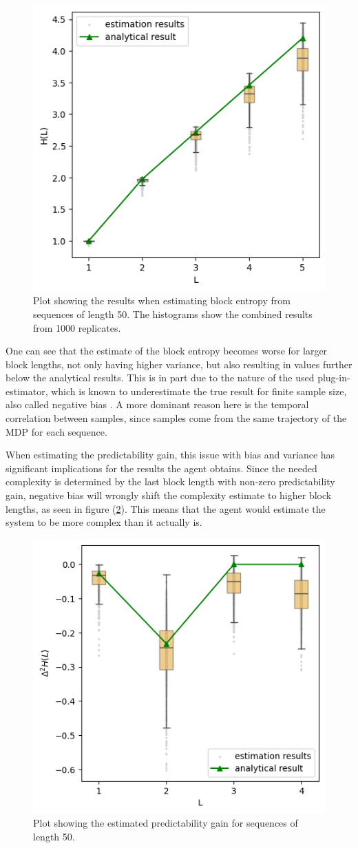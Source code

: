 \documentclass[12pt,a4paper]{article}
\begin{document}
\begin{figure}[H]
    \centering
    \includegraphics[width=0.6\linewidth]{../figures/block_entropy_estimation_thesis.png}
    \caption{\label{fig:entropy_est} Plot showing the results when estimating block entropy from sequences of length 50. The histograms show the combined results from 1000 replicates.}
\end{figure}

One can see that the estimate of the block entropy becomes worse for larger block lengths, not only having higher variance, but also resulting in values further below the analytical results.
This is in part due to the nature of the used plug-in-estimator, which is known to underestimate the true result for finite sample size, also called negative bias \autocite{basharin1959plugin}.
A more dominant reason here is the temporal correlation between samples, since samples come from the same trajectory of the MDP for each sequence.

When estimating the predictability gain, this issue with bias and variance has significant implications for the results the agent obtains.
Since the needed complexity is determined by the last block length with non-zero predictability gain, negative bias will wrongly shift the complexity estimate to higher block lengths, as seen in figure (\ref{fig:pred_gain}).
This means that the agent would estimate the system to be more complex than it actually is.

\begin{figure}[H]
    \centering
    \includegraphics[width=0.6\linewidth]{../figures/predictability_gain_thesis.png}
    \caption{\label{fig:pred_gain} Plot showing the estimated predictability gain for sequences of length 50.}
\end{figure}
\end{document}
